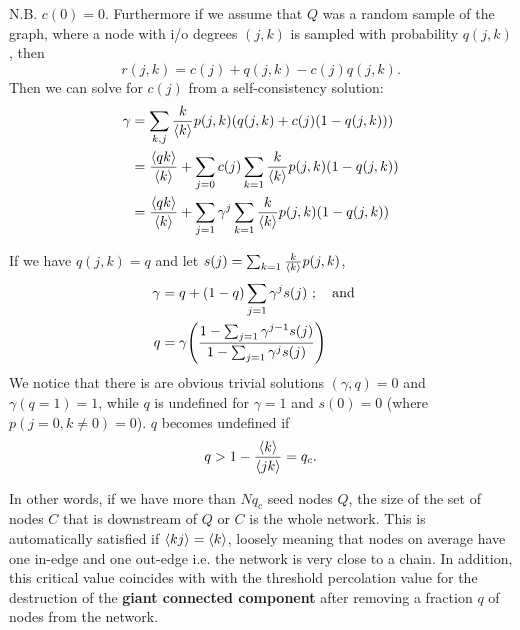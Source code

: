 \documentclass[10pt]{beamer}
\begin{document}
\begin{frame}
N.B. $c(0) = 0$. Furthermore if we assume that $Q$ was a random sample of the graph, where a node with i/o degrees $(j,k)$ is sampled with probability $q(j,k)$, then
\begin{equation}
r(j,k) = c(j) + q(j,k) - c(j)q(j,k).
\end{equation}
Then we can solve for $c(j)$ from a self-consistency solution:
\begin{align}
\gamma &= \sum_{k,j}\frac{k}{\expval{k}} p(j, k)\qty(q(j,k) + c(j)\qty(1-q(j,k)))\\
&= \frac{\expval{qk}}{\expval{k}} + \sum_{j=0}c(j)\sum_{k=1}\frac{k}{\expval{k}} p(j, k)\qty(1-q(j,k)) \\
&= \frac{\expval{qk}}{\expval{k}} + \sum_{j=1}\gamma^j\sum_{k=1}\frac{k}{\expval{k}} p(j, k)\qty(1-q(j,k))
\end{align}

\end{frame}
\begin{frame}
If we have $q(j,k) = q$ and let $s(j) = \sum_{k=1}\frac{k}{\expval{k}} p(j, k)$,
\begin{align}
\gamma &= q + \qty(1-q) \sum_{j=1}\gamma^{j}s(j)\ ; \qand \\
q &= \gamma \qty(\frac{1-\sum_{j=1} \gamma^{j-1}s(j)}{1-\sum_{j=1} \gamma^js(j)})
\end{align}
We notice that there is are obvious trivial solutions $(\gamma, q) = 0$ and $\gamma(q=1) = 1$, while $q$ is undefined for $\gamma = 1$ and $s(0) = 0$ (where $p(j=0, k \neq 0)=0$). $q$ becomes undefined if
\begin{equation}
q > 1 - \frac{\expval{k}}{\expval{jk}} = q_c.
\end{equation}
\end{frame}

\begin{frame}
In other words, if we have more than $Nq_c$ seed nodes $Q$, the size of the set of nodes $C$ that is downstream of $Q$ or $C$ is the whole network. This is automatically satisfied if $\expval{kj} = \expval{k}$, loosely meaning that nodes on average have one in-edge and one out-edge i.e. the network is very close to a chain. In addition, this critical value coincides with with the threshold percolation value for the destruction of the \textbf{giant connected component} after removing a fraction $q$ of nodes from the network.
\end{frame}
\end{document}
